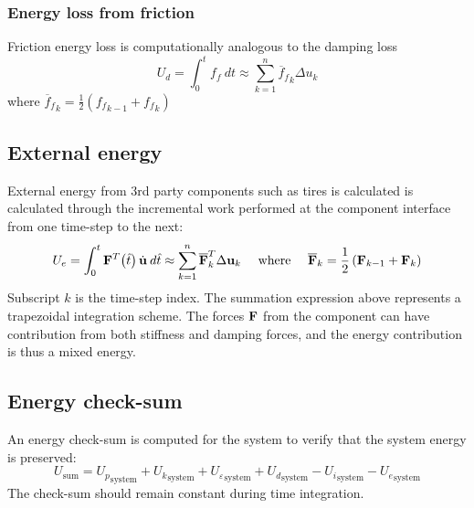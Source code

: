 \subsubsection{Energy loss from friction}

Friction energy loss is computationally analogous to the damping loss
%
\begin{equation}
U_{d} = \int_{0}^{t} f_{f}\:dt \approx \sum_{k=1}^{n} {\overline{f}{}_f}_k  \Delta u_{k}   
\end{equation}
%
\noindent
where 
${\overline{f}{}_f}_k = \frac{1}{2}\left( {f_f}_{k-1} + 
{f_f}_k \right)$ 

\subsection{External energy}

External energy from 3rd party components such as tires is calculated
is calculated through the incremental work performed at the component interface
from one time-step to the next:
%
\begin{equation}
 U_{e} = \int_{0}^{t} {{\bf F}^T\!\left( { {\hat t} }\right) \dot{\bf u} \:d{\hat t} 
\approx \sum_{k = 1}^{n} {\overline {{\bf F}}_{k}^{T}\Delta {\bf u}_{k} } } 
 \mbox{\ \ \ \ where\ \ \ \ }
\overline{{\bf F}}_{k}  = \frac{{1}}{{2}}\left( {\bf F}_{k - 1} + {\bf F}_{k}  \right)
\label{eqEC:83}
\end{equation}
%
Subscript $k$ is the time-step index. The summation expression 
above represents a trapezoidal integration scheme. The forces $\bf F$ from the
component can have contribution from both stiffness and damping forces, 
and the energy contribution is thus a mixed energy. 


\subsection{Energy check-sum}

An energy check-sum is computed for the system to verify that the 
system energy is preserved:
%
\begin{equation}
U_{\text{sum}} = {U_p}_{\text{system}}  + {U_k}_{\text{system}}  
               + {U_\varepsilon}_{\text{system}}  
               + {U_d}_{\text{system}} - {U_i}_{\text{system}} - {U_e}_{\text{system}}
\label{eqEC:811}
\end{equation}
%
\noindent
The check-sum should remain constant during time integration.
